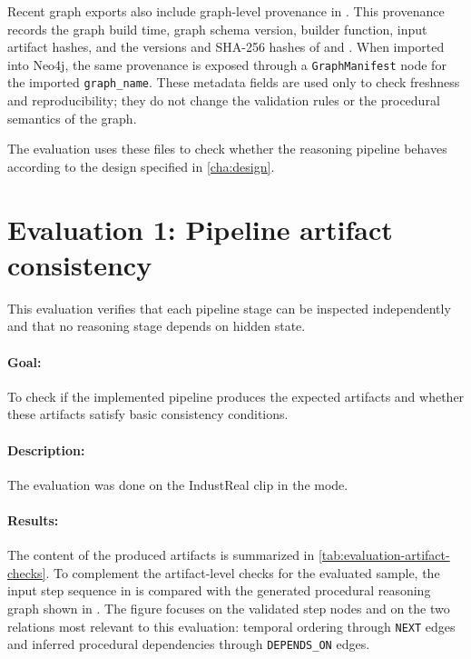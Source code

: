 Recent graph exports also include graph-level provenance in
. This provenance records the graph build
time, graph schema version, builder function, input artifact hashes, and the
versions and SHA-256 hashes of  and
. When imported into Neo4j, the same provenance
is exposed through a \texttt{GraphManifest} node for the imported
\texttt{graph\_name}. These metadata fields are used only to check freshness and
reproducibility; they do not change the validation rules or the procedural
semantics of the graph.

The evaluation uses these files to check whether the reasoning pipeline behaves according to the design specified in \cref{cha:design}.

\section{Evaluation 1: Pipeline artifact consistency}
\label{sec:evaluation-artifact-correctness}

This evaluation verifies that each pipeline stage can be inspected independently and
that no reasoning stage depends on hidden state.

\paragraph{Goal:}
To check if the implemented pipeline produces the expected artifacts and whether these artifacts satisfy basic consistency conditions. 

\paragraph{Description:}
The evaluation was done on the IndustReal clip  in the  mode.

\paragraph{Results:}
The content of the produced artifacts is summarized in \cref{tab:evaluation-artifact-checks}.
To complement the artifact-level checks for the evaluated sample, the input step sequence in  is compared with the generated procedural reasoning graph shown in . The figure focuses on the validated step nodes and on the two relations most relevant to this evaluation: temporal ordering through \texttt{NEXT} edges and inferred procedural dependencies through \texttt{DEPENDS\_ON} edges. 

